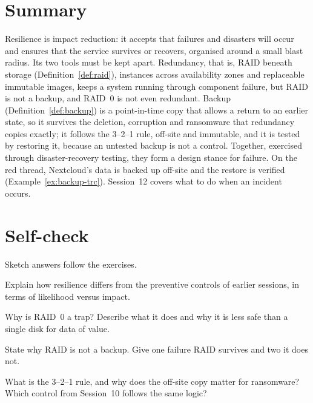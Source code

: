 \section{Summary}

Resilience is impact reduction: it accepts that failures and disasters will
occur and ensures that the service survives or recovers, organised around a
small blast radius. Its two tools must be kept apart. Redundancy, that is,
RAID beneath storage (Definition~\ref{def:raid}), instances across
availability zones and replaceable immutable images, keeps a system running
through component failure, but RAID is not a backup, and RAID~0 is not even
redundant. Backup (Definition~\ref{def:backup}) is a point-in-time copy that
allows a return to an earlier state, so it survives the deletion, corruption
and ransomware that redundancy copies exactly; it follows the 3--2--1 rule,
off-site and immutable, and it is tested by restoring it, because an
untested backup is not a control. Together, exercised through
disaster-recovery testing, they form a design stance for failure. On the
red thread, Nextcloud's data is backed up off-site and the restore is
verified (Example~\ref{ex:backup-trc}). Session~12 covers what to do when an
incident occurs.

\section*{Self-check}

Sketch answers follow the exercises.

\begin{exercise}
Explain how resilience differs from the preventive controls of earlier
sessions, in terms of likelihood versus impact.
\end{exercise}

\begin{exercise}
Why is RAID~0 a trap? Describe what it does and why it is less safe than a
single disk for data of value.
\end{exercise}

\begin{exercise}
State why RAID is not a backup. Give one failure RAID survives and two it does
not.
\end{exercise}

\begin{exercise}
What is the 3--2--1 rule, and why does the off-site copy matter for
ransomware? Which control from Session~10 follows the same logic?
\end{exercise}

